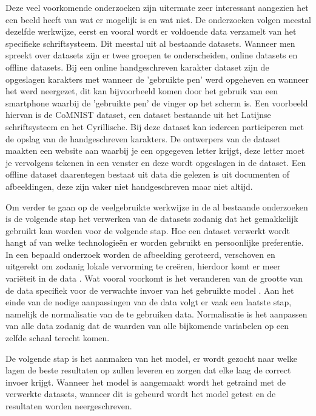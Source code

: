 Deze veel voorkomende onderzoeken zijn uitermate zeer interessant aangezien het een beeld heeft van wat er mogelijk is en wat niet.
De onderzoeken volgen meestal dezelfde werkwijze, eerst en vooral wordt er voldoende data verzamelt van het specifieke schriftsysteem. Dit meestal uit al bestaande datasets.
Wanneer men spreekt over datasets zijn er twee groepen te onderscheiden, online datasets en offline datasets. Bij een online handgeschreven karakter dataset zijn de opgeslagen karakters met wanneer de 'gebruikte pen' werd opgeheven en wanneer het werd neergezet, dit kan bijvoorbeeld komen door het gebruik van een smartphone waarbij de 'gebruikte pen' de vinger op het scherm is. 
Een voorbeeld hiervan is de CoMNIST dataset, een dataset bestaande uit het Latijnse schriftsysteem en het Cyrillische. Bij deze dataset kan iedereen participeren met de opslag van de handgeschreven karakters.
De ontwerpers van de dataset maakten een website aan waarbij je een opgegeven letter krijgt, deze letter moet je vervolgens tekenen in een venster en deze wordt opgeslagen in de dataset.
Een offline dataset daarentegen bestaat uit data die gelezen is uit documenten of afbeeldingen, deze zijn vaker niet handgeschreven maar niet altijd.

Om verder te gaan op de veelgebruikte werkwijze in de al bestaande onderzoeken is de volgende stap het verwerken van de datasets zodanig dat het gemakkelijk gebruikt kan worden voor de volgende stap.
Hoe een dataset verwerkt wordt hangt af van welke technologieën er worden gebruikt en persoonlijke preferentie.
In een bepaald onderzoek worden de afbeelding geroteerd, verschoven en uitgerekt om zodanig lokale vervorming te creëren, hierdoor komt er meer variëteit in de data \autocite{Weixin}.
Wat vooral voorkomt is het veranderen van de grootte van de data specifiek voor de verwachte invoer van het gebruikte model \autocite{Aiquan2012} \autocite{Mahbubar2015}.
Aan het einde van de nodige aanpassingen van de data volgt er vaak een laatste stap, namelijk de normalisatie van de te gebruiken data.
Normalisatie is het aanpassen van alle data zodanig dat de waarden van alle bijkomende variabelen op een zelfde schaal terecht komen.

De volgende stap is het aanmaken van het model, er wordt gezocht naar welke lagen de beste resultaten op zullen leveren en zorgen dat elke laag de correct invoer krijgt.
Wanneer het model is aangemaakt wordt het getraind met de verwerkte datasets, wanneer dit is gebeurd wordt het model getest en de resultaten worden neergeschreven.

